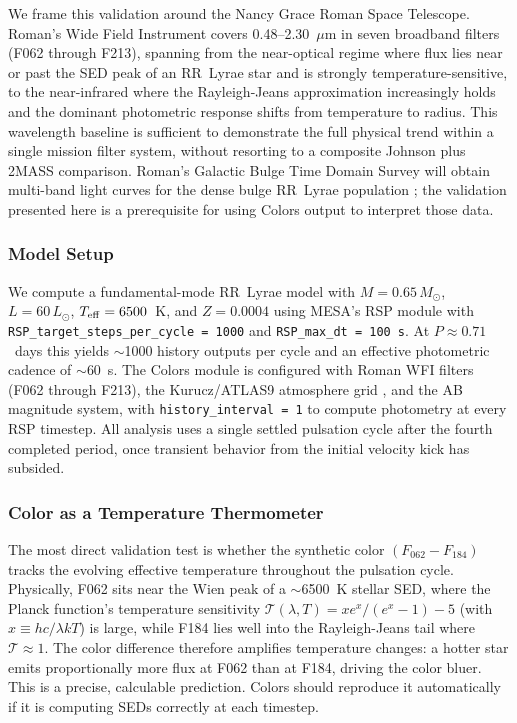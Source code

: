 \documentclass[linenumbers,apj,twocolumn, floatfix]{aastex701}
\begin{document}
We frame this validation around the Nancy Grace Roman Space Telescope. Roman's Wide Field
Instrument covers 0.48--2.30~$\mu$m in seven broadband filters (F062 through F213),
spanning from the near-optical regime where flux lies near or past the SED peak of an
RR~Lyrae star and is strongly temperature-sensitive, to the near-infrared where the
Rayleigh-Jeans approximation increasingly holds and the dominant photometric response shifts
from temperature to radius. This wavelength baseline is sufficient to demonstrate the full
physical trend within a single mission filter system, without resorting to a composite
Johnson plus 2MASS comparison. Roman's Galactic Bulge Time Domain Survey will obtain
multi-band light curves for the dense bulge RR~Lyrae population \citep{roman}; the
validation presented here is a prerequisite for using Colors output to interpret those data.

\subsubsection{Model Setup}
\label{sec:rsp_setup}

We compute a fundamental-mode RR~Lyrae model with $M = 0.65\,M_\odot$, $L = 60\,L_\odot$,
$T_{\rm eff} = 6500$~K, and $Z = 0.0004$ using MESA's RSP module \citep{MESAV} with
\texttt{RSP\_target\_steps\_per\_cycle = 1000} and \texttt{RSP\_max\_dt = 100\,s}. At
$P \approx 0.71$~days this yields $\sim$1000 history outputs per cycle and an effective
photometric cadence of $\sim$60~s. The Colors module is configured with Roman WFI filters
(F062 through F213), the Kurucz/ATLAS9 atmosphere grid \citep{Castelli04}, and the AB
magnitude system, with \texttt{history\_interval = 1} to compute photometry at every RSP
timestep. All analysis uses a single settled pulsation cycle after the fourth completed
period, once transient behavior from the initial velocity kick has subsided.

\subsubsection{Color as a Temperature Thermometer}
\label{sec:rsp_temp}

The most direct validation test is whether the synthetic color $(F_{062} - F_{184})$
tracks the evolving effective temperature throughout the pulsation cycle. Physically, F062
sits near the Wien peak of a $\sim$6500~K stellar SED, where the Planck function's
temperature sensitivity $\mathcal{T}(\lambda,T) = xe^x/(e^x-1) - 5$ (with $x \equiv
hc/\lambda kT$) is large, while F184 lies well into the Rayleigh-Jeans tail where
$\mathcal{T} \approx 1$. The color difference therefore amplifies temperature changes: a
hotter star emits proportionally more flux at F062 than at F184, driving the color bluer.
This is a precise, calculable prediction. Colors should reproduce it automatically if it
is computing SEDs correctly at each timestep.
\end{document}
